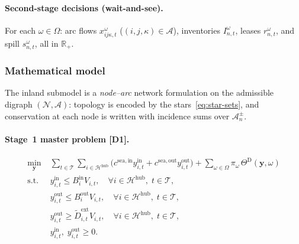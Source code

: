\documentclass[a4paper,fleqn]{cas-sc}
\begin{document}
\paragraph{Second-stage decisions (wait-and-see).}
For each $\omega\in\Omega$: arc flows $x_{ij\kappa,t}^{\omega}$
($(i,j,\kappa)\in\mathcal{A}$), inventories $I_{n,t}^{\omega}$, leases
$r_{n,t}^{\omega}$, and spill $s_{n,t}^{\omega}$, all in $\mathbb{R}_+$.

\subsubsection{Mathematical model}
\label{sec:ecr_mathmodel}

The inland submodel is a \emph{node--arc} network formulation on the
admissible digraph $(\mathcal{N},\mathcal{A})$: topology is encoded by the
stars~\eqref{eq:star-sets}, and conservation at each node is written with
incidence sums over $\mathcal{A}_n^{\pm}$.

\paragraph{Stage~1 master problem [D1].}
\begin{align}
\min_{\boldsymbol{y}}\;
& \sum_{t\in\mathcal{T}}\sum_{i\in\mathcal{H}^{\mathrm{hub}}}
\bigl(c^{\mathrm{sea,in}} y_{i,t}^{\mathrm{in}}
+ c^{\mathrm{sea,out}} y_{i,t}^{\mathrm{out}}\bigr)
+ \sum_{\omega\in\Omega}\pi_{\omega}\,\Theta^{\mathrm{D}}(\boldsymbol{y},\omega)
\label{eq:d1-obj} \\
\text{s.t.}\;
& y_{i,t}^{\mathrm{in}} \le B_i^{\mathrm{in}} V_{i,t},
\quad \forall i\in\mathcal{H}^{\mathrm{hub}},\; t\in\mathcal{T},
\label{eq:d1-capin} \\
& y_{i,t}^{\mathrm{out}} \le B_i^{\mathrm{out}} V_{i,t},
\quad \forall i\in\mathcal{H}^{\mathrm{hub}},\; t\in\mathcal{T},
\label{eq:d1-capout} \\
& y_{i,t}^{\mathrm{out}} \ge \tilde{D}_{i,t}^{\mathrm{ext}} V_{i,t},
\quad \forall i\in\mathcal{H}^{\mathrm{hub}},\; t\in\mathcal{T},
\label{eq:d1-export} \\
& y_{i,t}^{\mathrm{in}},\; y_{i,t}^{\mathrm{out}} \ge 0.
\label{eq:d1-nn}
\end{align}
\end{document}
